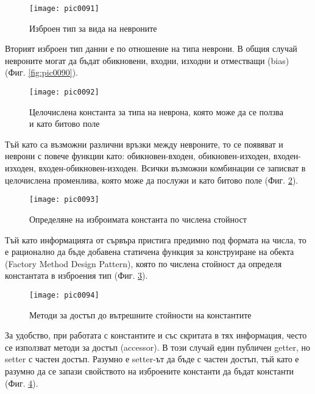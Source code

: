 \begin{figure}[h]
  \centering
  \texttt{[image: pic0091]}
  \caption{Изброен тип за вида на невроните}
\label{fig:pic0091}
\end{figure}
\FloatBarrier

Вторият изброен тип данни е по отношение на типа неврони. В общия случай невроните могат да бъдат обикновени, входни, изходни и отместващи (bias) (Фиг. \ref{fig:pic0090}).

\begin{figure}[h]
  \centering
  \texttt{[image: pic0092]}
  \caption{Целочислена константа за типа на неврона, която може да се ползва и като битово поле}
\label{fig:pic0092}
\end{figure}
\FloatBarrier

Тъй като са възможни различни връзки между невроните, то се появяват и неврони с повече функции като: обикновен-входен, обикновен-изходен, входен-изходен, входен-обикновен-изходен. Всички възможни комбинации се записват в целочислена променлива, която може да послужи и като битово поле (Фиг. \ref{fig:pic0092}).

\begin{figure}[h]
  \centering
  \texttt{[image: pic0093]}
  \caption{Определяне на изброимата константа по числена стойност}
\label{fig:pic0093}
\end{figure}
\FloatBarrier

Тъй като информацията от сървъра пристига предимно под формата на числа, то е рационално да бъде добавена статичена функция за конструиране на обекта (Factory Method Design Pattern), която по числена стойност да определя константата в изброения тип (Фиг. \ref{fig:pic0093}).

\begin{figure}[h]
  \centering
  \texttt{[image: pic0094]}
  \caption{Методи за достъп до вътрешните стойности на константите}
\label{fig:pic0094}
\end{figure}
\FloatBarrier

За удобство, при работата с константите и със скритата в тях информация, често се използват методи за достъп (accessor). В този случай един публичен getter, но setter с частен достъп. Разумно е setter-ът да бъде с частен достъп, тъй като е разумно да се запази свойството на изброените константи да бъдат константи (Фиг. \ref{fig:pic0094}).